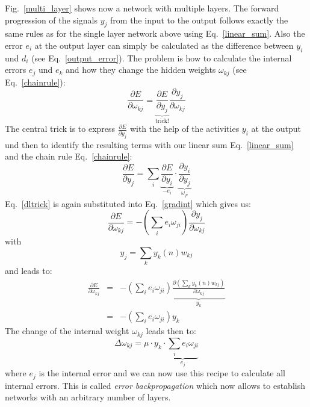 \documentclass[12pt]{article}
\begin{document}
Fig.~\ref{multi_layer} shows now a network with multiple layers.
The forward progression of the signals $y_j$ from the input to
the output follows exactly the same rules as for the single
layer network above using Eq.~\ref{linear_sum}.
Also the error $e_i$ at the output layer can simply be calculated
as the difference between $y_i$ und $d_i$ (see
Eq.~\ref{output_error}). The problem is how to calculate the
internal errors $e_j$ und $e_k$ and how they change the hidden weights $\omega_{kj}$
(see Eq.~\ref{chainrule}):
\begin{equation}
  \frac{\partial E}{\partial \omega_{kj}} = \underbrace{\frac{\partial E}{\partial y_j}}_\textrm{trick!} \frac{\partial y_j}{\partial \omega_{kj}}
  \label{gradint}
\end{equation}
The central trick is to express 
$\frac{\partial E}{\partial y_j}$ with the help of the activities $y_i$ at the output und then to identify the
resulting terms with our linear sum Eq.~\ref{linear_sum} and the chain rule Eq.~\ref{chainrule}:
\begin{equation}
  \frac{\partial E}{\partial y_j} = \sum_i \underbrace{\frac{\partial E}{\partial y_i}}_{-e_i} \cdot \underbrace{\frac{\partial y_i}{\partial y_j}}_{\omega_{ji}} \label{dltrick}
\end{equation}
Eq.~\ref{dltrick} is again substituted into Eq.~\ref{gradint} which gives us:
\begin{equation}
  \frac{\partial E}{\partial \omega_{kj}} = - \left( \sum_i e_i \omega_{ji} \right) \frac{\partial y_j}{\partial \omega_{kj}}
  \label{gradintback}
\end{equation}
with
\begin{equation}
y_j = \sum_k y_k(n) w_{kj}
\end{equation}
and leads to:
\begin{eqnarray}
  \frac{\partial E}{\partial \omega_{kj}} & = & - \left( \sum_i e_i \omega_{ji} \right) \underbrace{\frac{\partial \left(\sum_k y_k(n) w_{kj}\right)}{\partial \omega_{kj}}}_{y_k} \\
                                         & = & - \left( \sum_i e_i \omega_{ji} \right) y_k
\end{eqnarray}
The change of the internal weight $\omega_{kj}$ leads then to:
\begin{equation}
\Delta\omega_{kj} = \mu \cdot y_k \cdot \underbrace{\sum_i e_i \omega_{ji}}_{e_j}
\end{equation}
where $e_j$ is the internal error and we can now use this recipe to calculate all internal errors.
This is called \textsl{error backpropagation} which now allows to establish networks with an arbitrary number
of layers.
\end{document}
